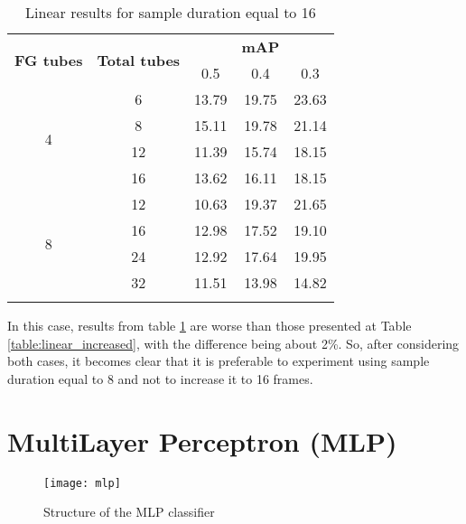 \begin{center}
  \begin{longtable}{|| c | c || c c c ||}
    \hline
    \multirow{2}{*}{\textbf{FG tubes}} & \multirow{2}{*}{\textbf{Total tubes}} & {} & \textbf{mAP} & {} \\
    {} & {} & 0.5 & 0.4 & 0.3 \\
    \hline
    \multirow{4}{*}{4} & 6 & 13.79 & 19.75 & 23.63 \\
    \cline{2-5}
    {} & 8 & 15.11 & 19.78 & 21.14 \\
    \cline{2-5}
    {} & 12 & 11.39 & 15.74 & 18.15 \\
    \cline{2-5}
    {} & 16 & 13.62 & 16.11 & 18.15 \\
    \hline
    \multirow{4}{*}{8} & 12 & 10.63 & 19.37 & 21.65 \\
    \cline{2-5}
    {} & 16 & 12.98 & 17.52 & 19.10 \\
    \cline{2-5}
    {} & 24 & 12.92 & 17.64 & 19.95 \\
    \cline{2-5}
    {} & 32 & 11.51 & 13.98 & 14.82 \\
    \hline

  \caption{Linear results for sample duration equal to 16}
  \label{table:linear_16}
\end{longtable}
\end{center}


In this case, results from table \ref{table:linear_16} are worse than  those presented at Table \ref{table:linear_increased}, with the difference being about 2\%.
So, after considering both cases, it becomes clear that it is preferable to experiment using sample duration equal to 8 and not to increase it to 16 frames.


\section{MultiLayer Perceptron (MLP)}

\begin{figure}[h]
  \centering
  \texttt{[image: mlp]}
  \caption{Structure of the MLP classifier}
  \label{fig:mlp_structure}
\end{figure}

